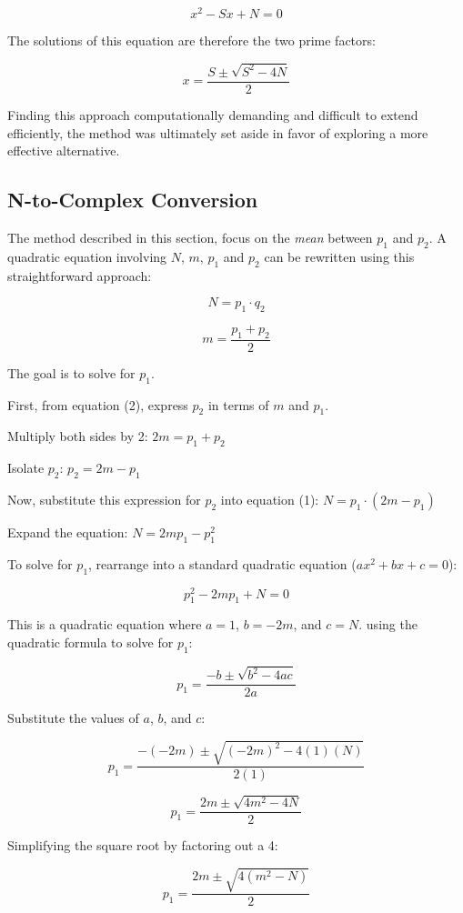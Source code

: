 \documentclass[11pt,a4paper]{article}
\begin{document}
\[
x^{2} - Sx + N = 0
\]

The solutions of this equation are therefore the two prime factors:

\[
x = \frac{S \pm \sqrt{S^{2} - 4N}}{2}
\]

Finding this approach computationally demanding and difficult to extend efficiently, the method was ultimately set aside in favor of exploring a more effective alternative.

\subsection{N-to-Complex Conversion}
The method described in this section, focus on the \emph{mean} between \( p_1 \) and \( p_2 \).
A quadratic equation involving \(N\), \(m\), \( p_1 \) and \( p_2 \) can be rewritten using this straightforward approach:

\[
N = p_1 \cdot q_2
\]

\[ m = \frac{p_1 + p_2}{2} \]

\medskip
The goal is to solve for \( p_1 \).

\medskip
First, from equation (2), express \( p_2 \) in terms of \( m \) and \( p_1 \).

\medskip
Multiply both sides by 2: \(2m = p_1 + p_2\)

\medskip
Isolate $p_2$: $p_2 = 2m - p_1$

\medskip
Now, substitute this expression for $p_2$ into equation (1): $N = p_1 \cdot (2m - p_1)$

\medskip
Expand the equation: $N = 2mp_1 - p_1^2$

\medskip
To solve for $p_1$, rearrange into a standard quadratic equation ($ax^2 + bx + c = 0$):

\[
p_1^2 - 2mp_1 + N = 0
\]

This is a quadratic equation where $a=1$, $b=-2m$, and $c=N$. using the quadratic formula to solve for $p_1$:

\medskip
\[p_1 = \frac{-b \pm \sqrt{b^2 - 4ac}}{2a}\]

\medskip
Substitute the values of $a$, $b$, and $c$:

\medskip
\[p_1 = \frac{-(-2m) \pm \sqrt{(-2m)^2 - 4(1)(N)}}{2(1)}\]

\medskip
\[p_1 = \frac{2m \pm \sqrt{4m^2 - 4N}}{2}\]

\medskip
Simplifying the square root by factoring out a 4:

\medskip
\[p_1 = \frac{2m \pm \sqrt{4(m^2 - N)}}{2}\]
\end{document}
